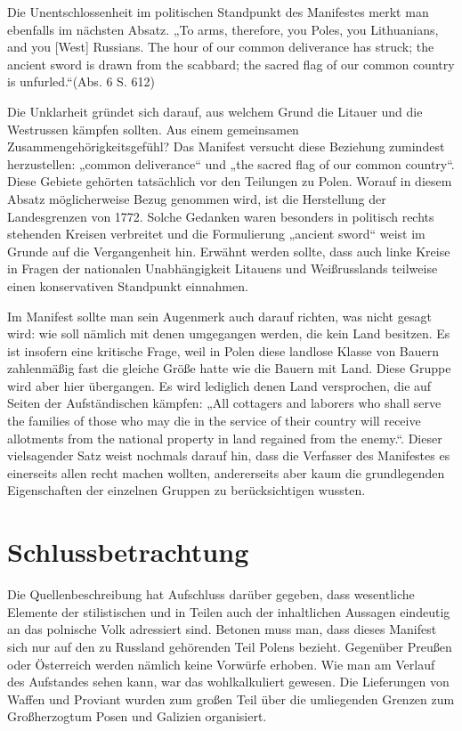 \documentclass[12pt,headsepline,a4paper]{scrartcl}
\begin{document}
Die Unentschlossenheit im politischen Standpunkt des Manifestes merkt man ebenfalls im nächsten
Absatz. „To arms, therefore, you Poles, you Lithuanians, and you [West] Russians. The hour of our
common deliverance has struck; the ancient sword is drawn from the scabbard; the sacred flag of
our common country is unfurled.“(Abs. 6 S. 612)

Die Unklarheit gründet sich darauf, aus welchem Grund die Litauer und die Westrussen kämpfen
sollten. Aus einem gemeinsamen Zusammengehörigkeitsgefühl? Das Manifest versucht diese
Beziehung zumindest herzustellen: „common deliverance“ und „the sacred flag of our common country“.
Diese Gebiete gehörten tatsächlich vor den Teilungen zu Polen. Worauf in diesem Absatz
möglicherweise Bezug genommen wird, ist die Herstellung der Landesgrenzen von 1772. Solche
Gedanken waren besonders in politisch rechts stehenden Kreisen verbreitet und die Formulierung
„ancient sword“ weist im Grunde auf die Vergangenheit hin.\autocite[25]{kowalski1954} Erwähnt werden sollte, dass auch
linke Kreise in Fragen der nationalen Unabhängigkeit Litauens und Weißrusslands teilweise einen
konservativen Standpunkt einnahmen.

Im Manifest sollte man sein Augenmerk auch darauf richten, was nicht gesagt wird: wie soll
nämlich mit denen umgegangen werden, die kein Land besitzen. Es ist insofern eine kritische Frage,
weil in Polen diese landlose Klasse von Bauern zahlenmäßig fast die gleiche Größe hatte wie die
Bauern mit Land.\autocite[15]{kowalski1954} Diese Gruppe wird aber hier übergangen. Es wird lediglich denen Land
versprochen, die auf Seiten der Aufständischen kämpfen: „All cottagers and laborers who shall
serve the families of those who may die in the service of their country will receive allotments from
the national property in land regained from the enemy.“. Dieser vielsagender Satz weist nochmals
darauf hin, dass die Verfasser des Manifestes es einerseits allen recht machen wollten, andererseits
aber kaum die grundlegenden Eigenschaften der einzelnen Gruppen zu berücksichtigen wussten.

\newpage
\section*{Schlussbetrachtung}

Die Quellenbeschreibung hat Aufschluss darüber gegeben, dass wesentliche Elemente der stilistischen und
in Teilen auch der inhaltlichen Aussagen eindeutig an das polnische Volk adressiert sind. Betonen
muss man, dass dieses Manifest sich nur auf den zu Russland gehörenden Teil Polens bezieht.
Gegenüber Preußen oder Österreich werden nämlich keine Vorwürfe erhoben. Wie man am Verlauf
des Aufstandes sehen kann, war das wohlkalkuliert gewesen. Die Lieferungen von
Waffen und Proviant wurden zum großen Teil über die umliegenden Grenzen zum Großherzogtum
Posen und Galizien organisiert.
\end{document}
